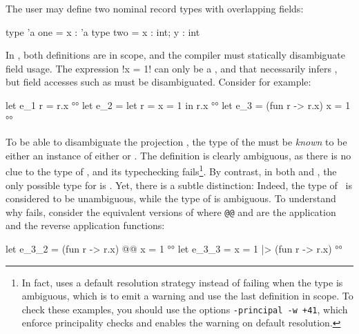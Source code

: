 \documentclass[acmsmall,screen,nonacm,review]{acmart}
\begin{document}
The user may define two nominal record types with overlapping fields:
\begin{program}[input]
type 'a one = {x : 'a}
type two = {x : int; y : int}
\end{program}
In \OCaml, both definitions are in scope, and the compiler must
statically disambiguate field usage. The expression \ocaml!{x = 1}! can
only be a , and that  necessarily infers ,
but field accesses such as  must be disambiguated. Consider for
example:
\begin{program}[input]
let e_1 r = r.x                         °°
let e_2 = let r = {x = 1} in r.x        °°
let e_3 = (fun r -> r.x) {x = 1}        °°
\end{program}
To be able to disambiguate the projection , the type of the
 must be \emph{known} to be either an instance of either
 or . The definition  is
clearly ambiguous, as there is no clue to the type of , and
its typechecking fails\footnote {In fact, \OCaml uses a default
resolution strategy instead of failing when the type is ambiguous,
  which is to emit a warning and use the last definition in scope. To
  check these examples, you should use the options
  \texttt{-principal -w +41}, which enforce principality checks and enables
  the warning on default resolution.}.
\relax
By contrast, in both  and , the only possible
type for  is . Yet, there is a subtle distinction: Indeed, the
type of~ is considered to be unambiguous, while the type of
 is ambiguous.
%
To understand why  fails, consider the equivalent versions of
 where \texttt{@@} and \ocaml{|>} are the application and the
reverse application functions:
\begin{program}[input]
let e_3_2 = (fun r -> r.x) @@ {x = 1}   °°
let e_3_3 = {x = 1} |> (fun r -> r.x)   °°
\end{program}
\end{document}
